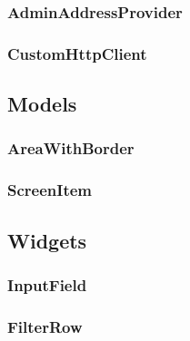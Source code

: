 \subsubsection{AdminAddressProvider}

\subsubsection{CustomHttpClient}

\subsection{Models}

\subsubsection{AreaWithBorder}

\subsubsection{ScreenItem}

\subsection{Widgets}

\subsubsection{InputField}
\label{fig:InputField} 

\subsubsection{FilterRow}
\label{fig:FilterRow}